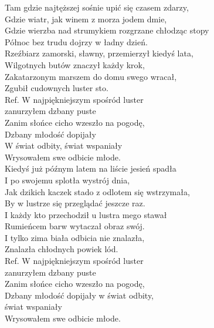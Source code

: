 
Tam gdzie najtęższej sośnie upić się czasem zdarzy, \\
Gdzie wiatr, jak winem z morza jodem dmie,\tab{} \\
Gdzie wierzba nad strumykiem rozgrzane chłodząc stopy \\
Północ bez trudu dojrzy w ładny dzień. \tab{}\\
Rzeźbiarz zamorski, sławny, przemierzył kiedyś lata, \\
Wilgotnych butów znaczył każdy krok, \tab{}\\
Zakatarzonym marszem do domu swego wracał, \\
Zgubił cudownych luster sto. \tab{}\tab{}\\
\hops
Ref. W najpiękniejszym spośród luster \tab{} \\
 zanurzyłem dzbany puste \tab{}\tab{}\\
 Zanim słońce cicho wzeszło na pogodę, \tab{}\\
 Dzbany młodość dopijały \tab{}\tab{}\\
 W świat odbity, świat wspaniały \tab{}\\
 Wrysowałem swe odbicie młode. \tab{}\\
\hops
Kiedyś już późnym latem na liście jesień spadła \\
I po swojemu splotła wystrój dnia, \\
Jak dzikich kaczek stado z odlotem się wstrzymała, \\
By w lustrze się przeglądać jeszcze raz. \\
I każdy kto przechodził u lustra mego stawał \\
Rumieńcem barw wytaczał obraz swój. \\
I tylko zima biała odbicia nie znalazła, \\
Znalazła chłodnych powiek lód. \\
\hops
Ref. W najpiękniejszym spośród luster \\
 zanurzyłem dzbany puste \\
 Zanim słońce cicho wzeszło na pogodę, \\
 Dzbany młodość dopijały w świat odbity, \\
 świat wspaniały \\
 Wrysowałem swe odbicie młode. 